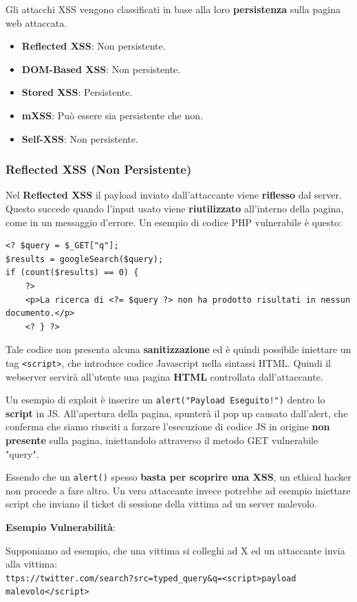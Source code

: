 \documentclass{article}
\begin{document}
Gli attacchi XSS vengono classificati in base alla loro \textbf{persistenza} sulla pagina web attaccata.
\begin{itemize}
	\item \textbf{Reflected XSS}: Non persistente.
	\item \textbf{DOM-Based XSS}: Non persistente.
	\item \textbf{Stored XSS}: Persistente.
	\item \textbf{mXSS}: Può essere sia persistente che non.
	\item \textbf{Self-XSS}: Non persistente.
\end{itemize}

\subsubsection{Reflected XSS (Non Persistente)}
Nel \textbf{Reflected XSS} il payload inviato dall'attaccante viene \textbf{riflesso} dal server. Questo succede quando l'input usato viene \textbf{riutilizzato} all'interno della pagina, come in un messaggio d'errore. Un esempio di codice PHP vulnerabile è questo:
\begin{verbatim}
<? $query = $_GET["q"];
$results = googleSearch($query);
if (count($results) == 0) {
	?>
	<p>La ricerca di <?= $query ?> non ha prodotto risultati in nessun documento.</p>
	<? } ?>
\end{verbatim}

Tale codice non presenta alcuna \textbf{sanitizzazione} ed è quindi possibile iniettare un tag \verb|<script>|, che introduce codice Javascript nella sintassi HTML. Quindi il webserver servirà all'utente una pagina \textbf{HTML} controllata dall'attaccante.

Un esempio di exploit è inserire un \verb|alert("Payload Eseguito!")| dentro lo \textbf{script} in JS. All'apertura della pagina, spunterà il pop up causato dall'alert, che conferma che siamo riusciti a forzare l'esecuzione di codice JS in origine \textbf{non presente} sulla pagina, iniettandolo attraverso il metodo GET vulnerabile "query".

Essendo che un \verb|alert()| spesso \textbf{basta per scoprire una XSS}, un ethical hacker non procede a fare altro. Un vero attaccante invece potrebbe ad esempio iniettare script che inviano il ticket di sessione della vittima ad un server malevolo.

\textbf{Esempio Vulnerabilità}:

Supponiamo ad esempio, che una vittima si colleghi ad X ed un attaccante invia alla vittima:\\
\verb|ttps://twitter.com/search?src=typed_query&q=<script>payload|
\verb|malevolo</script>| 
\end{document}
